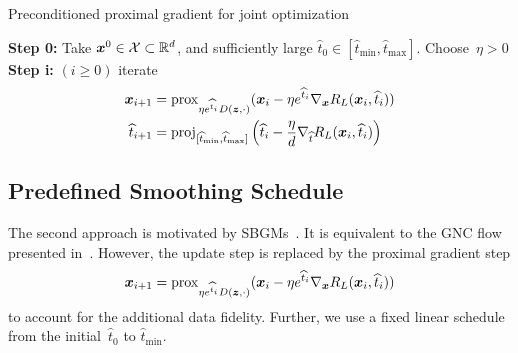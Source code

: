 \documentclass{article}
\newcommand{\X}{\mathcal{X}}
\newcommand{\norm}[1]{\left\Vert#1\right\Vert}
\newcommand{\scal}[2]{\left\langle#1,#2\right\rangle}
\newcommand{\prox}{\mathrm{prox}}
\newcommand{\proj}{\mathrm{proj}}
\def\hatt{{\widehat{t}}}
\newcommand{\tminh}{\hatt_\mathrm{min}}
\newcommand{\tmaxh}{\hatt_\mathrm{max}}
\theoremstyle{plain}
\theoremstyle{definition}
\theoremstyle{remark}
\begin{document}
\begin{algorithm}
\caption{Preconditioned proximal gradient for joint optimization}\label{alg:jointMinimization}
\textbf{Step 0:} Take $\vx^0\in\X\subset\R^d$, and sufficiently large $\hatt_0\in[\tminh,\tmaxh]$.
Choose~$\eta>0$\\
\textbf{Step i:} $(i\geq 0)$ iterate
\begin{align*}
\vx_{i+1} &= \prox_{\eta e^{\hatt_i} D(\vz,\cdot)}(\vx_i-\eta e^{\hatt_i}\nabla_\vx R_L(\vx_i,\hatt_i))\\
\hatt_{i+1} &= \proj_{[\tminh,\tmaxh]}\left(\hatt_i-\frac{\eta}{d}\nabla_\hatt R_L(\vx_i,\hatt_i)\right)
\end{align*}
\end{algorithm}

\subsection{Predefined Smoothing Schedule} \label{sec:predefinedSchedule}
The second approach is motivated by SBGMs~\citep{SoEr19,HoJa20}.
It is equivalent to the GNC flow presented in~.
However, the update step is replaced by the proximal gradient step
\begin{align} \label{eq:fixedScheme}
\vx_{i+1} = \prox_{\eta e^{\hatt_i} D(\vz,\cdot)}(\vx_i-\eta e^{\hatt_i}\nabla_\vx R_L(\vx_i,\hatt_i))
\end{align}
to account for the additional data fidelity.
Further, we use a fixed linear schedule from the initial~$\hatt_0$ to $\tminh$.
\end{document}
